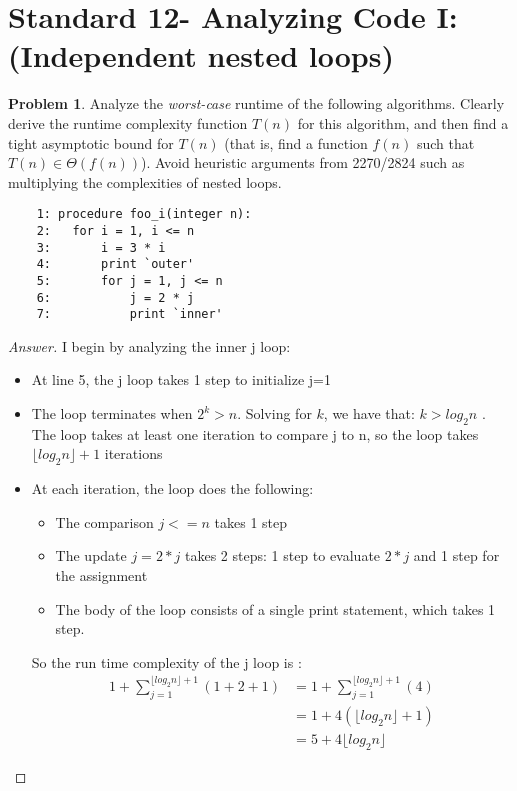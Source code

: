 \documentclass[11pt]{article}
\theoremstyle{definition}
\theoremstyle{definition}
\newtheorem{required}{Problem}
\theoremstyle{definition}
\begin{document}
\section{Standard 12- Analyzing Code I: (Independent nested loops)}
\begin{required}


Analyze the \textit{worst-case} runtime of the following algorithms. Clearly derive the runtime complexity function $T(n)$ for this algorithm, and then find a tight asymptotic bound for $T(n)$ (that is, find a function $f(n)$ such that $T(n) \in \Theta(f(n))$). Avoid heuristic arguments from 2270/2824 such as multiplying the complexities of nested loops.

\begin{verbatim}
	1: procedure foo_i(integer n):
	2:   for i = 1, i <= n
	3:       i = 3 * i
	4:       print `outer'
	5:       for j = 1, j <= n 
	6:           j = 2 * j
	7:           print `inner'
\end{verbatim}


\begin{proof}[Answer]
I begin by analyzing the inner j loop:
\begin{itemize}
\item At line 5, the j loop takes 1 step to initialize j=1
\item The loop terminates when $2^k > n$. Solving for $k$, we have that: $k > log_2 n$ . The loop takes at least one iteration to compare j to n, so the loop takes $\lfloor{ log_2 n }\rfloor +1$ iterations 
\item At each iteration, the loop does the following:
	\begin{itemize}
	\item The comparison $j<=n$ takes 1 step
	\item The update $j=2*j$ takes 2 steps:  1 step to evaluate $2*j$ and 1 step for the assignment 
	\item The body of the loop consists of a single print statement, which takes 1 step. 
	\end{itemize}
So the run time complexity of the j loop is :
\begin{align*} 
1+ \sum_{j=1}^{\lfloor log_2 n \rfloor +1} (1+2+1)  &= 1+ \sum_{j=1}^{\lfloor log_2 n \rfloor +1} (4) \\
&= 1+ 4(\lfloor log_2 n \rfloor +1) \\
&=5 + 4\lfloor log_2 n \rfloor
\end{align*}
\end{itemize}


\end{proof}
\end{required}
\end{document}
